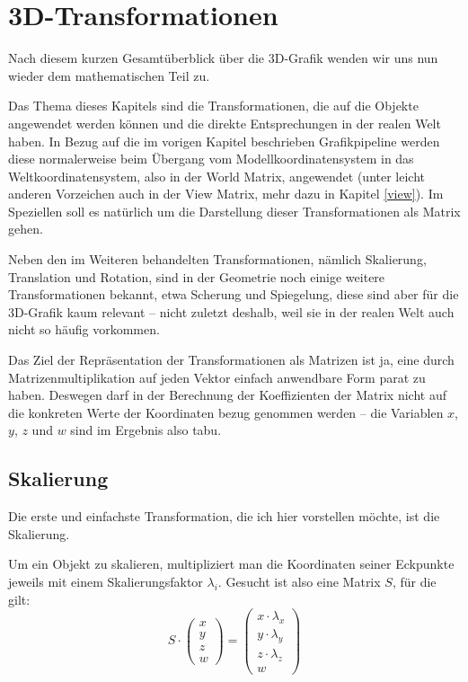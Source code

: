 \chapter{3D-Transformationen}
\label{transformation}

Nach diesem kurzen Gesamtüberblick über die 3D-Grafik wenden wir uns nun wieder dem mathematischen Teil zu.

Das Thema dieses Kapitels sind die Transformationen, die auf die Objekte angewendet werden können und die direkte Entsprechungen in der realen Welt haben. In Bezug auf die im vorigen Kapitel beschrieben Grafikpipeline werden diese normalerweise beim Übergang vom Modellkoordinatensystem in das Weltkoordinatensystem, also in der World Matrix, angewendet (unter leicht anderen Vorzeichen auch in der View Matrix, mehr dazu in Kapitel \ref{view}). Im Speziellen soll es natürlich um die Darstellung dieser Transformationen als Matrix gehen.

Neben den im Weiteren behandelten Transformationen, nämlich Skalierung, Translation und Rotation, sind in der Geometrie noch einige weitere Transformationen bekannt, etwa Scherung und Spiegelung, diese sind aber für die 3D-Grafik kaum relevant -- nicht zuletzt deshalb, weil sie in der realen Welt auch nicht so häufig vorkommen.

Das Ziel der Repräsentation der Transformationen als Matrizen ist ja, eine durch Matrizenmultiplikation auf jeden Vektor einfach anwendbare Form parat zu haben. Deswegen darf in der Berechnung der Koeffizienten der Matrix nicht auf die konkreten Werte der Koordinaten bezug genommen werden -- die Variablen $x$, $y$, $z$ und $w$ sind im Ergebnis also tabu.

\section{Skalierung}
Die erste und einfachste Transformation, die ich hier vorstellen möchte, ist die Skalierung.

Um ein Objekt zu skalieren, multipliziert man die Koordinaten seiner Eckpunkte jeweils mit einem Skalierungsfaktor $\lambda_i$. Gesucht ist also eine Matrix $S$, für die gilt:
\begin{equation}
 S \cdot
 \begin{pmatrix}
  x \\
  y \\
  z \\
  w
 \end{pmatrix}
 =
 \begin{pmatrix}
  x \cdot \lambda_x \\
  y \cdot \lambda_y \\
  z \cdot \lambda_z \\
  w
 \end{pmatrix}
\end{equation}

